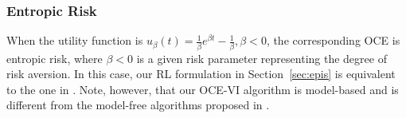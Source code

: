 \documentclass[11pt]{article}
\newcommand{\1}{\mathbbm{1}}
\begin{document}
\begin{itemize}

\end{itemize}


\subsubsection{Entropic Risk}
When the utility function is $u_{\beta}(t)=\frac{1}{\beta}e^{\beta t}-\frac{1}{\beta},\beta<0$, the corresponding OCE is entropic risk, where $\beta<0$ is a given risk parameter representing the degree of risk aversion. In this case, our RL formulation in Section~\ref{sec:epis} is equivalent to the one in \cite{fei2020risk}. Note, however, that our OCE-VI algorithm is model-based and is different from the model-free algorithms proposed in \cite{fei2020risk}. 
\end{document}
